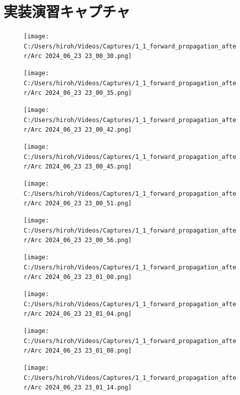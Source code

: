 \documentclass{ltjsarticle}
\begin{document}
\section{実装演習キャプチャ}
\begin{figure}[htbp]
  \centering
  \texttt{[image: C:/Users/hiroh/Videos/Captures/1\_1\_forward\_propagation\_after/Arc 2024\_06\_23 23\_00\_30.png]}
\end{figure}
\begin{figure}[htbp]
  \centering
  \texttt{[image: C:/Users/hiroh/Videos/Captures/1\_1\_forward\_propagation\_after/Arc 2024\_06\_23 23\_00\_35.png]}
\end{figure}
\begin{figure}[htbp]
  \centering
  \texttt{[image: C:/Users/hiroh/Videos/Captures/1\_1\_forward\_propagation\_after/Arc 2024\_06\_23 23\_00\_42.png]}
\end{figure}
\begin{figure}[htbp]
  \centering
  \texttt{[image: C:/Users/hiroh/Videos/Captures/1\_1\_forward\_propagation\_after/Arc 2024\_06\_23 23\_00\_45.png]}
\end{figure}
\begin{figure}[htbp]
  \centering
  \texttt{[image: C:/Users/hiroh/Videos/Captures/1\_1\_forward\_propagation\_after/Arc 2024\_06\_23 23\_00\_51.png]}
\end{figure}
\begin{figure}[htbp]
  \centering
  \texttt{[image: C:/Users/hiroh/Videos/Captures/1\_1\_forward\_propagation\_after/Arc 2024\_06\_23 23\_00\_56.png]}
\end{figure}
\begin{figure}[htbp]
  \centering
  \texttt{[image: C:/Users/hiroh/Videos/Captures/1\_1\_forward\_propagation\_after/Arc 2024\_06\_23 23\_01\_00.png]}
\end{figure}
\begin{figure}[htbp]
  \centering
  \texttt{[image: C:/Users/hiroh/Videos/Captures/1\_1\_forward\_propagation\_after/Arc 2024\_06\_23 23\_01\_04.png]}
\end{figure}
\begin{figure}[htbp]
  \centering
  \texttt{[image: C:/Users/hiroh/Videos/Captures/1\_1\_forward\_propagation\_after/Arc 2024\_06\_23 23\_01\_08.png]}
\end{figure}
\begin{figure}[htbp]
  \centering
  \texttt{[image: C:/Users/hiroh/Videos/Captures/1\_1\_forward\_propagation\_after/Arc 2024\_06\_23 23\_01\_14.png]}
\end{figure}
\end{document}
